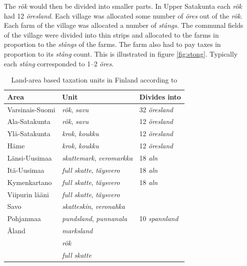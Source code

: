 \documentclass[a4paper]{article}
\begin{document}
The \emph{rök} would then be divided into smaller parts. In Upper
Satakunta each \emph{rök} had 12 \emph{öresland}. Each village was
allocated some number of \emph{öres} out of the \emph{rök}. Each farm
of the village was allocated a number of \emph{stångs}. The communal
fields of the village were divided into thin strips and allocated to
the farms in proportion to the \emph{stångs} of the farms. The farm
also had to pay taxes in proportion to its \emph{stång} count. This is
illustrated in figure \ref{fig:stong}. Typically each \emph{stång}
corresponded to 1–2 \emph{öres}.

\begin{table}
  \centering
  \begin{tabular}{lll}
    Area & Unit & Divides into  \\
    \hline
    Varsinais-Suomi & \emph{rök}, \emph{savu} & 32 \emph{öresland} \\
    Ala-Satakunta   & \emph{rök}, \emph{savu} & 12 \emph{öresland} \\
    Ylä-Satakunta   & \emph{krok}, \emph{koukku} & 12 \emph{öresland} \\
    Häme            & \emph{krok}, \emph{koukku} & 12 \emph{öresland}
    \\
    Länsi-Uusimaa   & \emph{skattemark}, \emph{veromarkka} & 18 \emph{aln} \\
    Itä-Uusimaa     & \emph{full skatte}, \emph{täysvero} & 18 \emph{aln} \\
    Kymenkartano    & \emph{full skatte}, \emph{täysvero} & 18 \emph{aln} \\
    Viipurin lääni  & \emph{full skatte}, \emph{täysvero} & \\
    Savo            & \emph{skatteskin}, \emph{veronahka} &  \\
    Pohjanmaa       & \emph{pundsland}, \emph{punnanala} & 10 \emph{spannland} \\
    Åland           & \emph{marksland} \\
                    & \emph{rök} \\
                    & \emph{full skatte} \\
  \end{tabular}
  \caption{Land-area based taxation units in Finland according to \cite{seppala09}}
  \label{tab_taxation_units}
\end{table}
\end{document}
